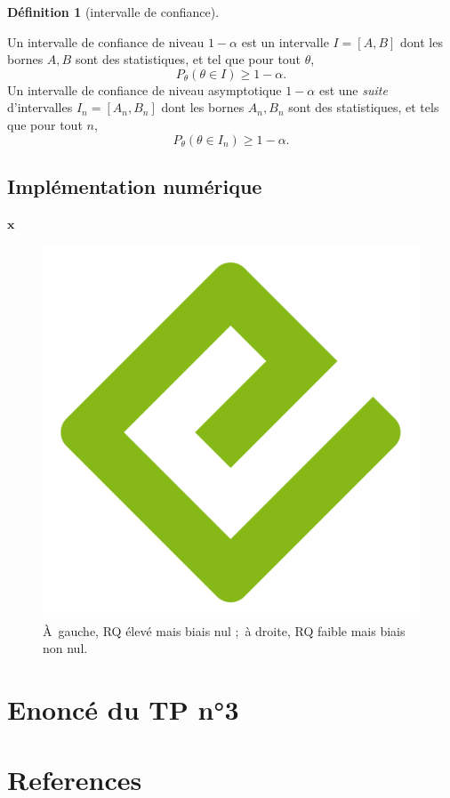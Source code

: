 \documentclass[
  10,
  letterpaper,
  DIV=11,
  numbers=noendperiod]{scrreport}
\newcommand{\bx}{\mathbf{x}}
\theoremstyle{plain}
\theoremstyle{definition}
\newtheorem{definition}{Définition}[chapter]
\theoremstyle{definition}
\theoremstyle{remark}
\begin{document}
\begin{definition}[intervalle de
confiance]\protect\hypertarget{def-ic}{}\label{def-ic}

Un intervalle de confiance de niveau \(1-\alpha\) est un intervalle
\(I = [A,B]\) dont les bornes \(A,B\) sont des statistiques, et tel que
pour tout \(\theta\), \[P_\theta(\theta \in I) \geqslant 1 - \alpha.\]
Un intervalle de confiance de niveau asymptotique \(1-\alpha\) est une
\emph{suite} d'intervalles \(I_n = [A_n,B_n]\) dont les bornes
\(A_n,B_n\) sont des statistiques, et tels que pour tout \(n\),
\[ P_\theta(\theta \in I_n) \geqslant 1 - \alpha.\]

\end{definition}

\section{Implémentation numérique}\label{impluxe9mentation-numuxe9rique}

\(\bx\)

\begin{figure}[H]

{\centering \includegraphics[width=0.5\linewidth,height=\textheight,keepaspectratio]{images/cover.png}

}

\caption{À~gauche, RQ élevé mais biais nul ;~à droite, RQ faible mais
biais non nul.}

\end{figure}%

\chapter{Enoncé du TP n°3}\label{enoncuxe9-du-tp-n3}


\chapter*{References}\label{references}
\end{document}
